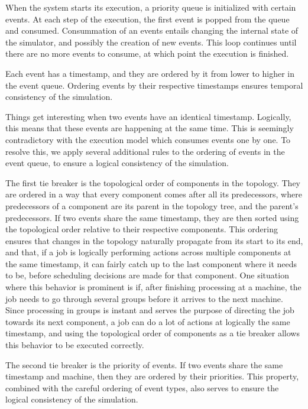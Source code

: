 When the system starts its execution, a priority queue is initialized with certain events. At each step of the execution, the first event is popped from the queue and consumed. Consummation of an events entails changing the internal state of the simulator, and possibly the creation of new events. This loop continues until there are no more events to consume, at which point the execution is finished. 

Each event has a timestamp, and they are ordered by it from lower to higher in the event queue. Ordering events by their respective timestamps ensures temporal consistency of the simulation.

Things get interesting when two events have an identical timestamp. Logically, this means that these events are happening at the same time. This is seemingly contradictory with the execution model which consumes events one by one. To resolve this, we apply several additional rules to the ordering of events in the event queue, to ensure a logical consistency of the simulation.

The first tie breaker is the topological order of components in the topology. They are ordered in a way that every component comes after all its predecessors, where predecessors of a component are its parent in the topology tree, and the parent's predecessors. If two events share the same timestamp, they are then sorted using the topological order relative to their respective components. This ordering ensures that changes in the topology naturally propagate from its start to its end, and that, if a job is logically performing actions across multiple components at the same timestamp, it can fairly catch up to the last component where it needs to be, before scheduling decisions are made for that component. One situation where this behavior is prominent is if, after finishing processing at a machine, the job needs to go through several groups before it arrives to the next machine. Since processing in groups is instant and serves the purpose of directing the job towards its next component, a job can do a lot of actions at logically the same timestamp, and using the topological order of components as a tie breaker allows this behavior to be executed correctly.

The second tie breaker is the priority of events. If two events share the same timestamp and machine, then they are ordered by their priorities. This property, combined with the careful ordering of event types, also serves to ensure the logical consistency of the simulation.

